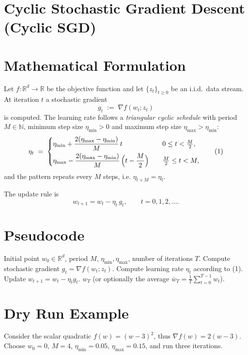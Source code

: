\documentclass[11pt]{article}
\begin{document}
\section*{Cyclic Stochastic Gradient Descent (Cyclic SGD)}

\section*{Mathematical Formulation}
Let $f:\mathbb{R}^d\rightarrow\mathbb{R}$ be the objective function and let
$\{z_t\}_{t\ge 0}$ be an i.i.d.\ data stream.
At iteration $t$ a stochastic gradient 
\[
g_t\;:=\;\nabla f(w_t;z_t)
\]
is computed.  
The learning rate follows a \emph{triangular cyclic schedule} with period $M\in\mathbb{N}$,
minimum step size $\eta_{\min}>0$ and maximum step size $\eta_{\max}>\eta_{\min}$:
\[
\eta_t \;=\;
\begin{cases}
\displaystyle 
\eta_{\min}+ \frac{2(\eta_{\max}-\eta_{\min})}{M}\,t \quad & 0\le t <\frac{M}{2},\\[6pt]
\displaystyle 
\eta_{\max}- \frac{2(\eta_{\max}-\eta_{\min})}{M}\,\Bigl(t-\frac{M}{2}\Bigr) \quad & \frac{M}{2}\le t < M,
\end{cases}
\tag{1}
\]
and the pattern repeats every $M$ steps, i.e. $\eta_{t+M}=\eta_t$.

The update rule is
\[
w_{t+1}=w_t-\eta_t\,g_t,\qquad t=0,1,2,\dots .
\tag{2}
\]

\section*{Pseudocode}
\begin{algorithm}[H]
\caption{Cyclic SGD}
\begin{algorithmic}[1]
\REQUIRE Initial point $w_0\in\mathbb{R}^d$, period $M$, $\eta_{\min},\eta_{\max}$, number of iterations $T$.
    \STATE Compute stochastic gradient $g_t=\nabla f(w_t;z_t)$.
    \STATE Compute learning rate $\eta_t$ according to (1).
    \STATE Update $w_{t+1}=w_t-\eta_t g_t$.
\ENDFOR
\RETURN $w_T$ (or optionally the average $\bar w_T=\frac1T\sum_{t=0}^{T-1}w_t$).
\end{algorithmic}
\end{algorithm}

\section*{Dry Run Example}
Consider the scalar quadratic $f(w)=(w-3)^2$, thus $\nabla f(w)=2(w-3)$.
Choose $w_0=0$, $M=4$, $\eta_{\min}=0.05$, $\eta_{\max}=0.15$, and run three iterations.
\end{document}
